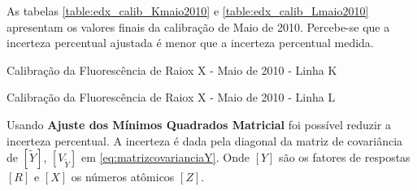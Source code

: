  
As tabelas \ref{table:edx_calib_Kmaio2010} e \ref{table:edx_calib_Lmaio2010}
apresentam os valores finais da calibração de Maio de 2010. 
Percebe-se que a incerteza percentual ajustada é menor que 
a incerteza percentual medida. 

\begin{table}[H]
  \centering
  \begin{scriptsize} 
    
  \end{scriptsize}
  \caption{Calibração da Fluorescência de Raiox X - Maio de 2010 - Linha K
  \label{table:edx_calib_Kmaio2010}}
\end{table}

\begin{table}[H]
  \centering
  \begin{scriptsize} 
    
  \end{scriptsize}
  \caption{Calibração da Fluorescência de Raiox X - Maio de 2010 - Linha L 
  \label{table:edx_calib_Lmaio2010}}
\end{table}

Usando \textbf{Ajuste dos Mínimos Quadrados Matricial} foi possível
reduzir a incerteza percentual. 
A incerteza é dada pela diagonal da matriz de covariância 
de $[\tilde{Y}]$, $[V_{\tilde{Y}}]$ em \ref{eq:matrizcovarianciaY}.
Onde $[Y]$ são os fatores de respostas $[R]$ e $[X]$ os números atômicos $[Z]$.

%  

%  

